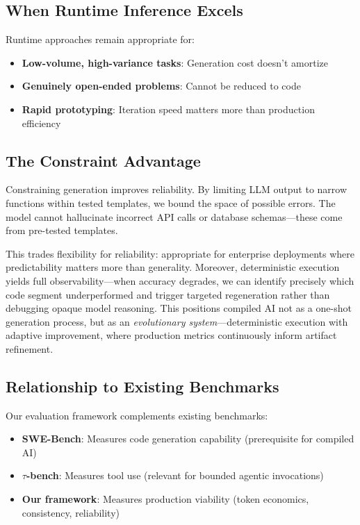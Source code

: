 \documentclass[11pt]{article}
\begin{document}
\subsection{When Runtime Inference Excels}

Runtime approaches remain appropriate for:
\begin{itemize}
    \item \textbf{Low-volume, high-variance tasks}: Generation cost doesn't amortize
    \item \textbf{Genuinely open-ended problems}: Cannot be reduced to code
    \item \textbf{Rapid prototyping}: Iteration speed matters more than production efficiency
\end{itemize}

\subsection{The Constraint Advantage}

Constraining generation improves reliability. By limiting LLM output to narrow functions within tested templates, we bound the space of possible errors. The model cannot hallucinate incorrect API calls or database schemas---these come from pre-tested templates.

This trades flexibility for reliability: appropriate for enterprise deployments where predictability matters more than generality. Moreover, deterministic execution yields full observability---when accuracy degrades, we can identify precisely which code segment underperformed and trigger targeted regeneration rather than debugging opaque model reasoning. This positions compiled AI not as a one-shot generation process, but as an \emph{evolutionary system}---deterministic execution with adaptive improvement, where production metrics continuously inform artifact refinement.

\subsection{Relationship to Existing Benchmarks}

Our evaluation framework complements existing benchmarks:
\begin{itemize}
    \item \textbf{SWE-Bench}: Measures code generation capability (prerequisite for compiled AI)
    \item \textbf{$\tau$-bench}: Measures tool use (relevant for bounded agentic invocations)
    \item \textbf{Our framework}: Measures production viability (token economics, consistency, reliability)
\end{itemize}
\end{document}
